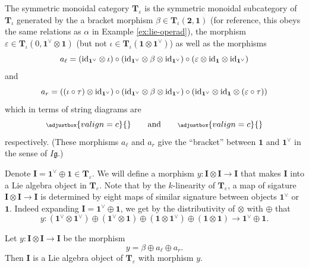 \begin{definition}
	The symmetric monoidal category \(\mathbf{T}_{\varepsilon}\) is the symmetric monoidal subcategory of \(\mathbf{T}_{\iota}\) generated by the a bracket morphism \(\beta \in \mathbf{T}_{\iota}(\mathbf{2}, \mathbf{1})\) (for reference, this obeys the same relations as \(\alpha\) in Example \ref{ex:lie-operad}), the morphism \(\varepsilon \in \mathbf{T}_{\iota}(0, \mathbf{1}^{\vee} \otimes \mathbf{1})\) (but not \(\iota \in \mathbf{T}_{\iota}(\mathbf{1} \otimes \mathbf{1}^{\vee})\)) as well as the morphisms
	\[
		a_{\ell}
		=
		(\mathrm{id}_{\mathbf{1}^{\vee}} \otimes \iota)
		\circ
		(\mathrm{id}_{\mathbf{1}^{\vee}} \otimes \beta \otimes \mathrm{id}_{\mathbf{1}^{\vee}})
		\circ
		(\varepsilon \otimes \mathrm{id}_{\mathbf{1}} \otimes \mathrm{id}_{\mathbf{1}^{\vee}})
	\]
	and
	\[
		a_{r}
		=
		((\iota \circ \tau) \otimes \mathrm{id}_{\mathbf{1}^{\vee}})
		\circ
		(\mathrm{id}_{\mathbf{1}^{\vee}} \otimes \beta \otimes \mathrm{id}_{\mathbf{1}^{\vee}})
		\circ
		(\mathrm{id}_{\mathbf{1}^{\vee}} \otimes \mathrm{id}_{\mathbf{1}} \otimes (\varepsilon \circ \tau))
	\]
	which in terms of string diagrams are
	\[
		{\scriptsize
		\def\svgscale{0.38}
		\adjustbox{valign=c}{}
		}
		\qquad
		\text{and}
		\qquad
		{\scriptsize
		\def\svgscale{0.38}
		\adjustbox{valign=c}{}
		}
	\]
	respectively. (These morphisms \(a_{\ell}\) and \(a_{r}\) give the ``bracket'' between \(\mathbf{1}\) and \(\mathbf{1}^{\vee}\) in the sense of \(I\mathfrak{g}\).)
\end{definition}

Denote \(\mathbf{I} = \mathbf{1}^{\vee} \oplus \mathbf{1} \in \mathbf{T}_{\varepsilon}\). We will define a morphism \(y: \mathbf{I} \otimes \mathbf{I} \to \mathbf{I}\) that makes \(\mathbf{I}\) into a Lie algebra object in \(\mathbf{T}_{\varepsilon}\). Note that by the \(k\)-linearity of \(\mathbf{T}_{\varepsilon}\), a map of sigature \(\mathbf{I} \otimes \mathbf{I} \to \mathbf{I}\) is determined by eight maps of similar signature between objects \(\mathbf{1}^{\vee}\) or \(\mathbf{1}\). Indeed expanding \(\mathbf{I} = \mathbf{1}^{\vee} \oplus \mathbf{1}\), we get by the distributivity of \(\otimes\) with \(\oplus\) that
\[
	y
	:
	(\mathbf{1}^{\vee} \otimes \mathbf{1}^{\vee})
	\oplus
	(\mathbf{1}^{\vee} \otimes \mathbf{1})
	\oplus
	(\mathbf{1} \otimes \mathbf{1}^{\vee})
	\oplus
	(\mathbf{1} \otimes \mathbf{1})
	\longrightarrow
	\mathbf{1}^{\vee} \oplus \mathbf{1}
	.
\]

\begin{theorem}
	\label{thm:y-is-lie-algebra-object-in-casimir-envelope}
	Let \(y: \mathbf{I} \otimes \mathbf{I} \to \mathbf{I}\) be the morphism
	\[
		y = \beta \oplus a_{\ell} \oplus a_{r}.
	\]
	Then \(\mathbf{I}\) is a Lie algebra object of \(\mathbf{T}_{\varepsilon}\) with morphism \(y\).
\end{theorem}


